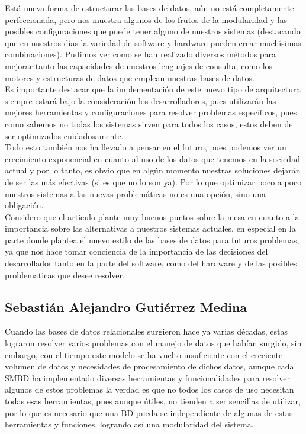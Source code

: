 \documentclass[12pt]{article}
\begin{document}
Está nueva forma de estructurar las bases de datos, aún no está completamente perfeccionada, pero nos muestra algunos de los frutos de la modularidad y las posibles configuraciones que puede tener alguno de nuestros sistemas (destacando que en nuestros días la variedad de software y hardware pueden crear muchísimas combinaciones). Pudimos ver como se han realizado diversos métodos para mejorar tanto las capacidades de nuestros lenguajes de consulta, como los motores y estructuras de datos que emplean nuestras bases de datos. \\

Es importante destacar que la implementación de este nuevo tipo de arquitectura siempre estará bajo la consideración los desarrolladores, pues utilizarán las mejores herramientas y configuraciones para resolver problemas específicos, pues como sabemos no todas los sistemas sirven para todos los casos, estos deben de ser optimizados cuidadosamente. \\

Todo esto también nos ha llevado a pensar en el futuro, pues podemos ver un crecimiento exponencial en cuanto al uso de los datos que tenemos en la sociedad actual y por lo tanto, es obvio que en algún momento nuestras soluciones dejarán de ser las más efectivas (si es que no lo son ya). Por lo que optimizar poco a poco nuestros sistemas a las nuevas problemáticas no es una opción, sino una obligación. \\

Considero que el articulo plante muy buenos puntos sobre la mesa en cuanto a la importancia sobre las alternativas a nuestros sistemas actuales, en especial en la parte donde plantea el nuevo estilo de las bases de datos para futuros problemas, ya que nos hace tomar conciencia de la importancia de las decisiones del desarrollador tanto en la parte del software, como del hardware y de las posibles problematicas que desee resolver.

\newpage
\subsection*{Sebastián Alejandro Gutiérrez Medina}

    Cuando las bases de datos relacionales surgieron hace ya varias décadas, estas lograron resolver varios problemas con el manejo de datos que habían surgido, sin embargo, con el tiempo este modelo se ha vuelto insuficiente con el creciente volumen de datos y necesidades de procesamiento de dichos datos, aunque cada SMBD ha implementado diversas herramientas y funcionalidades para resolver algunos de estos problemas la verdad es que no todos los casos de uso necesitan todas esas herramientas, pues aunque útiles, no tienden a ser sencillas de utilizar, por lo que es necesario que una BD pueda se independiente de algunas de estas herramientas y funciones, logrando así una modularidad del sistema.\\
\end{document}
